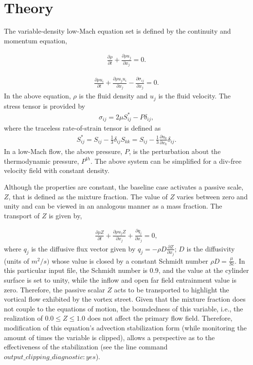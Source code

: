 \documentclass{article}
\begin{document}
\section{Theory}
The variable-density low-Mach equation set is defined by the continuity and momentum equation,

\begin{align}
  \frac {\partial \rho }{\partial t} + \frac{ \partial \rho u_j}{\partial x_j} = 0.
\label{eq:contEq}
\end{align} 

\begin{align}
  \frac {\partial \rho u_i }{\partial t} + \frac{ \partial \rho u_j u_i}{\partial x_j} 
-\frac{\partial \sigma_{ij}}{\partial x_j} = 0.
\label{eq:momEq}
\end{align}
%
In the above equation, $\rho$ is the fluid density and $u_j$ is the fluid velocity. 
The stress tensor is provided by
\begin{align}
\sigma_{ij}  = 2 \mu S^*_{ij} - P \delta_{ij},
\end{align}
%
where the traceless rate-of-strain tensor is defined as
\begin{align}
S^*_{ij}  = S_{ij} - \frac{1}{3} \delta_{ij} S_{kk} \nonumber
		     = S_{ij} - \frac{1}{3} \frac{\partial  u_k }{\partial x_k}\delta_{ij}.
\end{align}
In a low-Mach flow, the above pressure, $P$, is the perturbation about the thermodynamic
pressure, $P^{th}$. The above system can be simplified for a div-free velocity field with constant density.

Although the properties are constant, the baseline case activates a passive scale, $Z$, that is defined as the mixture
fraction. The value of $Z$ varies between zero and unity and can be viewed in an analogous manner as a mass fraction. The transport
of $Z$ is given by,

\begin{align}
  \frac {\partial \rho Z }{\partial t} + \frac{ \partial \rho u_j Z}{\partial x_j} +\frac{\partial q_j}{\partial x_j} = 0,
\label{eq:zEq}
\end{align} 
where $q_j$ is the diffusive flux vector given by $q_j = -\rho D \frac{\partial Z}{\partial x_j}$; $D$ is the diffusivity (units
of $m^2/s)$ whose value is closed by a constant Schmidt number $\rho D = \frac{\mu}{Sc}$. In this particular input file, the
Schmidt number is 0.9, and the value at the cylinder surface is set to unity, while the inflow and open far field entrainment
value is zero. Therefore, the passive scalar $Z$ acts to be transported to highlight the vortical flow exhibited by the 
vortex street. Given that the mixture fraction does not couple to the equations of motion, the boundedness of this variable, i.e.,
the realization of $0.0 \leq Z \leq 1.0$ does not affect the primary flow field. Therefore, modification of this equation's advection
stabilization form (while monitoring the amount of times the variable is clipped),
allows a perspective as to the effectiveness of the stabilization (see the line command $output\_clipping\_diagnostic: yes$).
\end{document}
